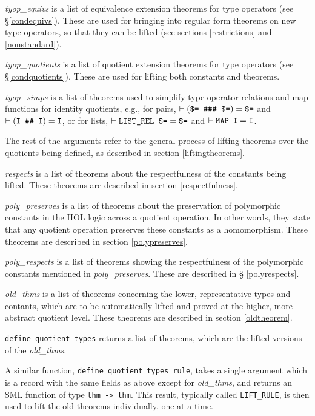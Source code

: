 \documentclass[envcountsame,runningheads]{llncs}
\begin{document}
{\it tyop\_equivs\/} is a list of equivalence extension theorems
for type operators
(see
\S\ref{condequivs}).  These are used for
bringing into regular form
theorems on new type operators, so that they can be lifted
(see sections \ref{restrictions} and
\ref{nonstandard}).

{\it tyop\_quotients\/} is a list of quotient extension theorems
for type operators
(see
\S\ref{condquotients}).  These are used for lifting both constants
and theorems.

{\it tyop\_simps\/} is a list of theorems used to simplify type operator
relations and map functions for identity quotients, e.g.,
for pairs,
$\vdash (\mbox{\tt \$= \#\#\# \$=}) = \mbox{\tt \$=}$ and
$\vdash (\mbox{\tt I \#\# I}) = \mbox{\tt I}$,
or for lists,
$\vdash \mbox{\tt LIST\_REL \$=} = \mbox{\tt \$=}$ and
$\vdash \mbox{\tt MAP I} = \mbox{\tt I}$.

The rest of the arguments refer to the general process of lifting theorems
over the quotients being defined,
as described in section \ref{liftingtheorems}.

{\it respects\/} is a list of theorems about the respectfulness of the
constants being lifted.
These theorems are described in section
\ref{respectfulness}.

{\it poly\_preserves\/} is a list of theorems about the preservation of
polymorphic constants in the HOL logic
across a quotient operation.
In other words, they state that any quotient operation preserves these
constants as a homomorphism.
These theorems are described in section
\ref{polypreserves}.

{\it poly\_respects\/} is a list of theorems showing the respectfulness
of the polymorphic constants mentioned in {\it poly\_preserves}.
These are
described in
\S
\ref{polyrespects}.

{\it old\_thms\/} is a list of theorems concerning the lower, representative
types and contants, which are to be automatically lifted and proved at the
higher, more abstract quotient level.
These theorems are described in section \ref{oldtheorem}.

{\tt define\_quotient\_types} returns a list of theorems, which are the
lifted versions of the {\it old\_thms}.

A similar function,
{\tt define\_quotient\_types\_rule}, takes a single argument which is a
record with the same fields as above except for {\it old\_thms},
and returns an SML function of type {\tt thm -> thm}.
This result, typically called {\tt LIFT\_RULE},
is then used to lift the old theorems individually, one at a time.
\end{document}
